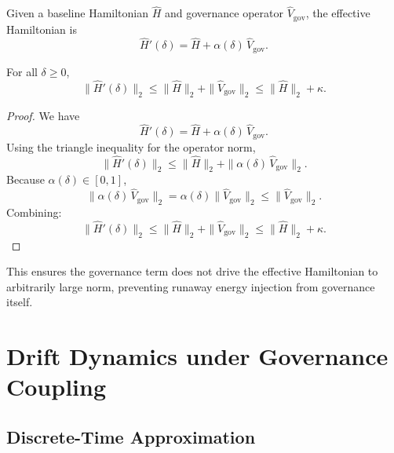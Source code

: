 \documentclass[11pt]{article}
\begin{document}
\begin{definition}
Given a baseline Hamiltonian $\hat{H}$ and governance operator $\hat{V}_{\mathrm{gov}}$, the effective Hamiltonian is
\begin{equation}
  \hat{H}'(\delta) = \hat{H} + \alpha(\delta)\,\hat{V}_{\mathrm{gov}}.
\end{equation}
\end{definition}

\begin{proposition}
For all $\delta \ge 0$,
\begin{equation}
  \|\hat{H}'(\delta)\|_2
  \le \|\hat{H}\|_2 + \|\hat{V}_{\mathrm{gov}}\|_2
  \le \|\hat{H}\|_2 + \kappa.
\end{equation}
\end{proposition}

\begin{proof}
We have
\begin{equation}
  \hat{H}'(\delta) = \hat{H} + \alpha(\delta)\,\hat{V}_{\mathrm{gov}}.
\end{equation}
Using the triangle inequality for the operator norm,
\begin{equation}
  \|\hat{H}'(\delta)\|_2
  \le \|\hat{H}\|_2 + \|\alpha(\delta)\,\hat{V}_{\mathrm{gov}}\|_2.
\end{equation}
Because $\alpha(\delta) \in [0,1]$,
\begin{equation}
  \|\alpha(\delta)\,\hat{V}_{\mathrm{gov}}\|_2
  = \alpha(\delta) \|\hat{V}_{\mathrm{gov}}\|_2
  \le \|\hat{V}_{\mathrm{gov}}\|_2.
\end{equation}
Combining:
\begin{equation}
  \|\hat{H}'(\delta)\|_2
  \le \|\hat{H}\|_2 + \|\hat{V}_{\mathrm{gov}}\|_2
  \le \|\hat{H}\|_2 + \kappa.
\end{equation}
\end{proof}

This ensures the governance term does not drive the effective Hamiltonian to arbitrarily large norm, preventing runaway energy injection from governance itself.

\section{Drift Dynamics under Governance Coupling}

\subsection{Discrete-Time Approximation}
\end{document}

